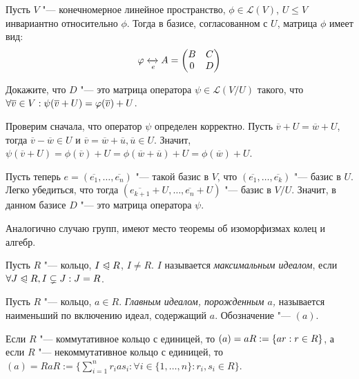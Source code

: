 \begin{exercise}
	Пусть $V$ "--- конечномерное линейное пространство, $\phi \in \mathcal{L}(V)$, $U \le V$ инвариантно относительно $\phi$. Тогда в базисе, согласованном с $U$, матрица $\phi$ имеет вид:
	\[\phi \xleftrightarrow[e]{} A = \begin{pmatrix}B & C \\ 0 & D\end{pmatrix}\]
	
	Докажите, что $D$ "--- это матрица оператора $\psi \in \mathcal{L}(V / U)$ такого, что $\forall \overline{v} \in V: \psi(\overline{v} \hm+ U) = \phi(\overline{v}) + U$.
\end{exercise}

\begin{solution}
	Проверим сначала, что оператор $\psi$ определен корректно. Пусть $\overline{v} + U = \overline{w} + U$, тогда $\overline{v} - \overline{w} \in U$ и $\overline{v} = \overline{w} + \overline{u}, \overline{u} \in U$. Значит, $\psi(\overline{v} + U) = \phi(\overline{v}) + U = \phi(\overline{w} + \overline{u}) + U = \phi(\overline{w}) + U$.
	
	Пусть теперь $e = (\overline{e_1}, \dotsc, \overline{e_n})$ "--- такой базис в $V$, что $(\overline{e_1}, \dotsc, \overline{e_k})$ "--- базис в $U$. Легко убедиться, что тогда $(\overline{e_{k+1}} + U, \dotsc, \overline{e_n} + U)$ "--- базис в $V / U$. Значит, в данном базисе $D$ "--- это матрица оператора $\psi$.
\end{solution}

\begin{note}
	Аналогично случаю групп, имеют место теоремы об изоморфизмах колец и алгебр.
\end{note}

\begin{definition}
	Пусть $R$ "--- кольцо, $I \normal R$, $I \ne R$. $I$ называется \textit{максимальным идеалом}, если $\forall J \normal R, I \subsetneq J: J = R$. 
\end{definition}
	
\begin{definition}
	Пусть $R$ "--- кольцо, $a \in R$. \textit{Главным идеалом, порожденным $a$,} называется наименьший по включению идеал, содержащий $a$. Обозначение "--- $(a)$.
\end{definition}

\begin{note}
	Если $R$ "--- коммутативное кольцо с единицей, то $(a) \hm= aR := \{ar: r \in R\}$, а если $R$ "--- некоммутативное кольцо с единицей, то $(a) = RaR := \{\sum_{i = 1}^nr_ias_i : \forall i \in \{1, \dotsc, n\}: r_i, s_i \in R\}$.
\end{note}

